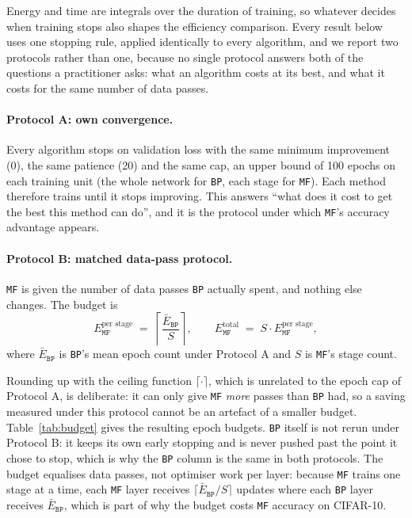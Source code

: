 \documentclass{llncs}
\newcommand{\MF}{\texttt{MF}}
\newcommand{\BP}{\texttt{BP}}
\begin{document}
Energy and time are integrals over the duration of training, so whatever
decides when training stops also shapes the efficiency comparison. Every result below uses one
stopping rule, applied identically to every algorithm, and we report two
protocols rather than one, because no single protocol answers both of the
questions a practitioner asks: what an algorithm costs at its best, and what it costs for the same number of data passes.

\paragraph{Protocol A: own convergence.}
Every algorithm stops on validation loss with the same minimum improvement
(\num{0}), the same patience (\num{20}) and the same cap, an upper bound of
\num{100} epochs on each training unit (the whole network for \BP{}, each stage
for \MF{}). Each method therefore trains until it stops improving. This answers ``what does it
cost to get the best this method can do'', and it is the protocol under which
\MF{}'s accuracy advantage appears.

\paragraph{Protocol B: matched data-pass protocol.}
\MF{} is given the number of data passes \BP{} actually spent, and nothing
else changes. The budget is
\begin{equation}
  E_{\MF{}}^{\text{per stage}}
  \;=\; \left\lceil \frac{\bar{E}_{\BP{}}}{S} \right\rceil ,
  \qquad
  E_{\MF{}}^{\text{total}} \;=\; S \cdot E_{\MF{}}^{\text{per stage}},
  \label{eq:budget}
\end{equation}
where $\bar{E}_{\BP{}}$ is \BP{}'s mean epoch count under Protocol A
and $S$ is \MF{}'s stage count.

Rounding up with the ceiling function
$\lceil\cdot\rceil$, which is unrelated to the epoch cap of Protocol A, is
deliberate: it can only give \MF{} \emph{more} passes than \BP{}
had, so a saving measured under this protocol cannot be an
artefact of a smaller budget. Table~\ref{tab:budget} gives the resulting epoch budgets.
\BP{} itself is not rerun under Protocol B: it keeps its own early stopping and is
never pushed past the point it chose to stop, which is why the \BP{} column is
the same in both protocols. The budget equalises data passes, not optimiser
work per layer: because \MF{} trains one stage at a time, each \MF{} layer
receives $\lceil \bar{E}_{\BP{}}/S \rceil$ updates where each \BP{} layer
receives $\bar{E}_{\BP{}}$, which is part of why the budget costs \MF{}
accuracy on CIFAR-10.
\end{document}
